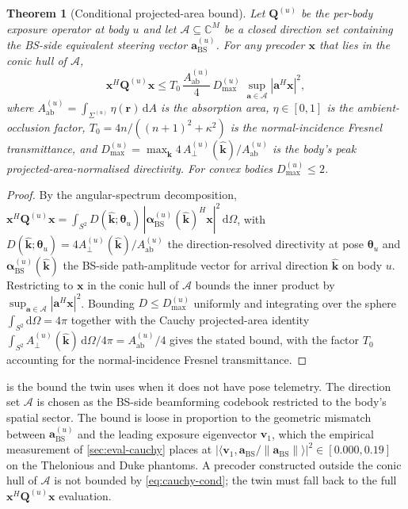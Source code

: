 \documentclass[journal,twocolumn,10pt]{IEEEtran}
\theoremstyle{plain}
\newtheorem{theorem}{Theorem}
\theoremstyle{remark}
\newcommand{\khat}{\hat{\bm{k}}}
\newcommand{\rr}{\mathbf{r}}
\newcommand{\xx}{\mathbf{x}}
\newcommand{\Aab}{A_{\mathrm{ab}}}
\newcommand{\Qmat}{\mathbf{Q}}
\newcommand{\diff}{\mathrm{d}}
\newcommand{\Complex}{\mathbb{C}}
\begin{document}
\begin{theorem}[Conditional projected-area bound]\label{thm:cauchy-cond}
Let $\Qmat^{(u)}$ be the per-body exposure operator at body $u$
and let $\mathcal{A} \subseteq \Complex^M$ be a closed direction
set containing the BS-side equivalent steering vector
$\mathbf{a}_{\mathrm{BS}}^{(u)}$. For any precoder $\xx$ that lies
in the conic hull of $\mathcal{A}$,
\begin{equation}\label{eq:cauchy-cond}
  \xx^H \Qmat^{(u)} \xx \leq T_0\,\frac{\Aab^{(u)}}{4}\,
  D_{\max}^{(u)}\;\sup_{\mathbf{a} \in \mathcal{A}}
  |\mathbf{a}^H \xx|^2,
\end{equation}
where $\Aab^{(u)} = \int_{\Sigma^{(u)}} \eta(\rr)\,\diff A$ is the
absorption area, $\eta \in [0,1]$ is the ambient-occlusion factor,
$T_0 = 4 n / ((n+1)^2 + \kappa^2)$ is the normal-incidence Fresnel
transmittance, and $D_{\max}^{(u)} = \max_{\khat}
4\,A_\perp^{(u)}(\khat)/\Aab^{(u)}$ is the body's peak
projected-area-normalised directivity. For convex bodies
$D_{\max}^{(u)} \leq 2$.
\end{theorem}

\begin{proof}
By the angular-spectrum decomposition,
$\xx^H \Qmat^{(u)} \xx = \int_{S^2} D(\khat;\bm\theta_u)\,
|\bm\alpha_{\mathrm{BS}}^{(u)}(\khat)^H \xx|^2\,\diff\Omega$,
with $D(\khat;\bm\theta_u) = 4 A_\perp^{(u)}(\khat)/\Aab^{(u)}$
the direction-resolved directivity at pose $\bm\theta_u$ and
$\bm\alpha_{\mathrm{BS}}^{(u)}(\khat)$ the BS-side path-amplitude
vector for arrival direction $\khat$ on body $u$. Restricting to
$\xx$ in the conic hull of $\mathcal{A}$ bounds the inner product
by $\sup_{\mathbf{a} \in \mathcal{A}} |\mathbf{a}^H \xx|^2$.
Bounding $D \leq D_{\max}^{(u)}$ uniformly and integrating over
the sphere $\int_{S^2} \diff\Omega = 4\pi$ together with the
Cauchy projected-area identity
$\int_{S^2} A_\perp^{(u)}(\khat)\,\diff\Omega/4\pi =
\Aab^{(u)}/4$ gives the stated bound, with the factor $T_0$
accounting for the normal-incidence Fresnel transmittance.
\end{proof}

 is the bound the twin uses when it does not
have pose telemetry. The direction set $\mathcal{A}$ is chosen as
the BS-side beamforming codebook restricted to the body's spatial
sector. The bound is loose in proportion to the geometric mismatch
between $\mathbf{a}_{\mathrm{BS}}^{(u)}$ and the leading exposure
eigenvector $\mathbf{v}_1$, which the empirical measurement of
\cref{sec:eval-cauchy} places at
$|\langle \mathbf{v}_1, \mathbf{a}_{\mathrm{BS}}/
\|\mathbf{a}_{\mathrm{BS}}\| \rangle|^2 \in [0.000, 0.19]$ on the
Thelonious and Duke phantoms. A precoder constructed outside the
conic hull of $\mathcal{A}$ is not bounded by \cref{eq:cauchy-cond};
the twin must fall back to the full $\xx^H \Qmat^{(u)} \xx$
evaluation.




\end{document}
